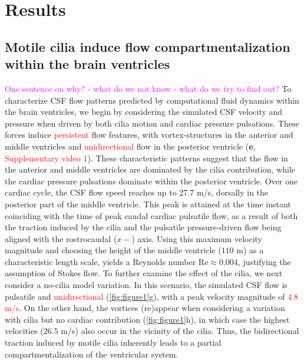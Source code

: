 \documentclass[fleqn]{wlscirep}
\newcommand{\mer}[1]{\textcolor{magenta}{#1}}
\newcommand{\fixme}[1]{\textcolor{red}{#1}}
\begin{document}
\section*{Results}\label{sec:results}

\subsection*{Motile cilia induce flow compartmentalization within the brain ventricles}

\mer{One sentence on why? - what do we not know - what do we try to
  find out?} To characterize CSF flow patterns predicted by
computational fluid dynamics within the brain ventricles, we begin by
considering the simulated CSF velocity and pressure when driven by
both cilia motion and cardiac pressure pulsations. These forces induce
\fixme{persistent} flow features, with vortex-structures in the
anterior and middle ventricles and \fixme{unidirectional} flow in the
posterior ventricle (\textbf{e},
\fixme{Supplementary video 1}). These characteristic patterns suggest
that the flow in the anterior and middle ventricles are dominated by
the cilia contribution, while the cardiac pressure pulsations dominate
within the posterior ventricle. Over one cardiac cycle, the CSF flow
speed reaches up to 27.7 \textmu m/s, dorsally in the posterior part
of the middle ventricle. This peak is attained at the time instant
coinciding with the time of peak caudal cardiac pulsatile flow, as a
result of both the traction induced by the cilia and the pulsatile
pressure-driven flow being aligned with the rostrocaudal ($x-$)
axis. Using this maximum velocity magnitude and choosing the height of
the middle ventricle ($110$ \textmu m) as a characteristic length
scale, yields a Reynolds number $\mathrm{Re} \approx 0.004$,
justifying the assumption of Stokes flow. To further examine the
effect of the cilia, we next consider a no-cilia model variation. In
this scenario, the simulated CSF flow is pulsatile and
\fixme{unidirectional} (\cref{fig:figure1}g), with a peak velocity
magnitude of \fixme{$4.8$ \textmu m/s}. On the other hand, the
vortices (re)appear when considering a variation with cilia but no
cardiac contribution (\cref{fig:figure1}h), in which case the highest
velocities ($26.5$ \textmu m/s) also occur in the vicinity of the
cilia. Thus, the bidirectional traction induced by motile cilia
inherently leads to a partial compartmentalization of the ventricular
system.
\end{document}
